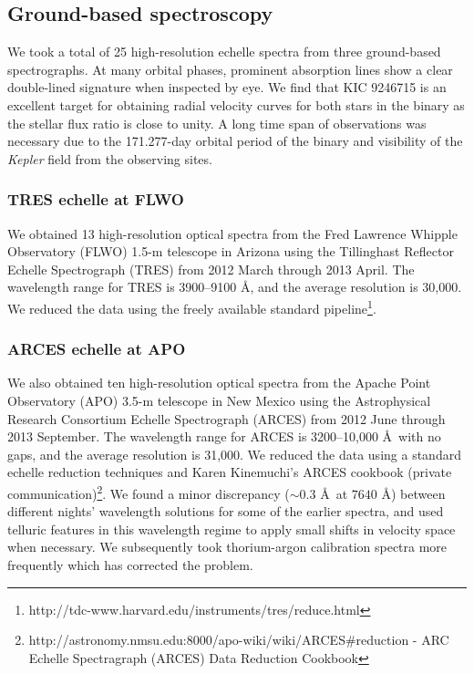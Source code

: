 \subsection{Ground-based spectroscopy}\label{spectra}
We took a total of 25 high-resolution echelle spectra from three ground-based spectrographs. At many orbital phases, prominent absorption lines show a clear double-lined signature when inspected by eye. We find that KIC 9246715 is an excellent target for obtaining radial velocity curves for both stars in the binary as the stellar flux ratio is close to unity. A long time span of observations was necessary due to the 171.277-day orbital period of the binary and visibility of the \emph{Kepler} field from the observing sites.

\subsubsection{TRES echelle at FLWO}\label{tres}
We obtained 13 high-resolution optical spectra from the Fred Lawrence Whipple Observatory (FLWO) 1.5-m telescope in Arizona using the Tillinghast Reflector Echelle Spectrograph (TRES) from 2012 March through 2013 April. The wavelength range for TRES is 3900--9100 \AA, and the average resolution is 30,000. We reduced the data using the freely available standard pipeline\footnote{http://tdc-www.harvard.edu/instruments/tres/reduce.html}.

\subsubsection{ARCES echelle at APO}\label{arces}
We also obtained ten high-resolution optical spectra from the Apache Point Observatory (APO) 3.5-m telescope in New Mexico using the Astrophysical Research Consortium Echelle Spectrograph (ARCES) from 2012 June through 2013 September. The wavelength range for ARCES is 3200--10,000 \AA \ with no gaps, and the average resolution is 31,000. We reduced the data using a standard echelle reduction techniques and Karen Kinemuchi's ARCES cookbook (private communication)\footnote{http://astronomy.nmsu.edu:8000/apo-wiki/wiki/ARCES#reduction - ARC Echelle Spectragraph (ARCES) Data Reduction Cookbook}. We found a minor discrepancy ($\sim 0.3$ \AA \ at $7640$ \AA) between different nights' wavelength solutions for some of the earlier spectra, and used telluric features in this wavelength regime to apply small shifts in velocity space when necessary. We subsequently took thorium-argon calibration spectra more frequently which has corrected the problem.

